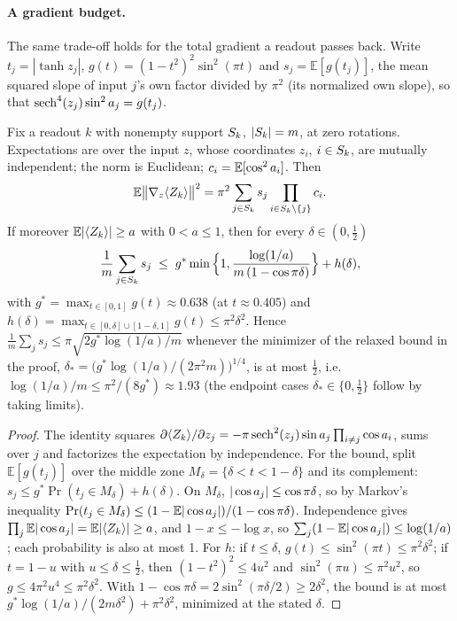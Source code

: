\paragraph{A gradient budget.} The same trade-off holds for the total gradient a readout passes back.
Write $t_j=|\tanh z_j|$, $g(t)=(1-t^2)^2\sin^2(\pi t)$ and $s_j=\mathbb{E}[g(t_j)]$, the mean squared
slope of input $j$'s own factor divided by $\pi^2$ (its normalized own slope), so that $\mathrm{sech}^4(z_j)\sin^2a_{j}=g(t_j)$.
\begin{proposition}\label{prop:gradbudget}
Fix a readout $k$ with nonempty support $S_k$, $|S_k|=m$, at zero rotations. Expectations are over the input $z$, whose coordinates $z_i$, $i\in S_k$, are mutually independent; the norm is Euclidean; $c_i=\mathbb{E}[\cos^2a_{i}]$. Then
\begin{equation*}
  \mathbb{E}\big\|\nabla_{z}\langle Z_{k}\rangle\big\|^2=\pi^2\sum_{j\in S_k}s_j\prod_{i\in S_k\setminus\{j\}}c_i .
\end{equation*}
If moreover $\mathbb{E}|\langle Z_{k}\rangle|\ge a$ with $0<a\le1$, then for every $\delta\in(0,\tfrac12)$
\begin{equation*}
  \frac1m\sum_{j\in S_k}s_j\;\le\;g^*\min\Big\{1,\frac{\log(1/a)}{m\,(1-\cos\pi\delta)}\Big\}+h(\delta),
\end{equation*}
with $g^*=\max_{t\in[0,1]}g(t)\approx0.638$ (at $t\approx0.405$) and $h(\delta)=\max_{t\in[0,\delta]\cup[1-\delta,1]}g(t)\le\pi^2\delta^2$.
Hence $\frac1m\sum_j s_j\le\pi\sqrt{2g^*\log(1/a)/m}$ whenever the minimizer of the relaxed bound in the proof, $\delta_*=\big(g^*\log(1/a)/(2\pi^2m)\big)^{1/4}$, is at most $\tfrac12$, i.e.\ $\log(1/a)/m\le\pi^2/(8g^*)\approx1.93$ (the endpoint cases $\delta_*\in\{0,\tfrac12\}$ follow by taking limits).
\end{proposition}
\begin{proof}
The identity squares $\partial\langle Z_{k}\rangle/\partial z_j=-\pi\,\mathrm{sech}^2(z_j)\sin a_{j}\prod_{i\ne j}\cos a_{i}$, sums over
$j$ and factorizes the expectation by independence. For the bound, split $\mathbb{E}[g(t_j)]$ over the
middle zone $M_\delta=\{\delta<t<1-\delta\}$ and its complement: $s_j\le g^*\Pr(t_j\in M_\delta)+h(\delta)$.
On $M_\delta$, $|\cos a_{j}|\le\cos\pi\delta$, so by Markov's inequality $\Pr(t_j\in M_\delta)\le(1-\mathbb{E}|\cos a_{j}|)/(1-\cos\pi\delta)$.
Independence gives $\prod_j\mathbb{E}|\cos a_{j}|=\mathbb{E}|\langle Z_{k}\rangle|\ge a$, and $1-x\le-\log x$, so
$\sum_j(1-\mathbb{E}|\cos a_{j}|)\le\log(1/a)$; each probability is also at most 1. For $h$: if $t\le\delta$,
$g(t)\le\sin^2(\pi t)\le\pi^2\delta^2$; if $t=1-u$ with $u\le\delta\le\frac12$, then $(1-t^2)^2\le4u^2$ and $\sin^2(\pi u)\le\pi^2u^2$, so
$g\le4\pi^2u^4\le\pi^2\delta^2$. With $1-\cos\pi\delta=2\sin^2(\pi\delta/2)\ge2\delta^2$, the bound is at most
$g^*\log(1/a)/(2m\delta^2)+\pi^2\delta^2$, minimized at the stated $\delta$.
\end{proof}
